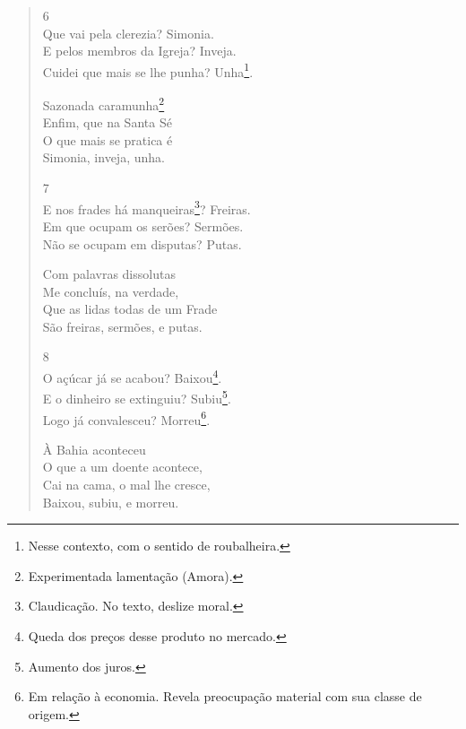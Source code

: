 \documentclass[12pt]{book}
\begin{document}
\begin{verse}
			6 \\
			Que vai pela clerezia? \dotfill Simonia. \\
			E pelos membros da Igreja? \dotfill Inveja. \\
			Cuidei que mais se lhe punha? \dotfill Unha\footnote{Nesse contexto, com o sentido de roubalheira.}.
			
			\hspace{5em} Sazonada caramunha\footnote{Experimentada lamentação (Amora).} \\
			\hspace{5em} Enfim, que na Santa Sé \\
			\hspace{5em} O que mais se pratica é \\
			\hspace{5em} Simonia, inveja, unha.
			
			7 \\
			E nos frades há manqueiras\footnote{Claudicação. No texto, deslize moral.}? \dotfill Freiras. \\
			Em que ocupam os serões? \dotfill Sermões. \\
			Não se ocupam em disputas? \dotfill Putas.
			
			\hspace{5em} Com palavras dissolutas \\
			\hspace{5em} Me concluís, na verdade, \\
			\hspace{5em} Que as lidas todas de um Frade\\
			\hspace{5em} São freiras, sermões, e putas.
			
			8 \\
			O açúcar já se acabou? \dotfill Baixou\footnote{Queda dos preços desse produto no mercado.}. \\
			E o dinheiro se extinguiu? \dotfill Subiu\footnote{Aumento dos juros.}. \\
			Logo já convalesceu? \dotfill Morreu\footnote{Em relação à economia. Revela preocupação material com sua classe de origem.}.
			
			\hspace{5em} À Bahia aconteceu \\
			\hspace{5em} O que a um doente acontece, \\
			\hspace{5em} Cai na cama, o mal lhe cresce, \\
			\hspace{5em} Baixou, subiu, e morreu.
			

\end{verse}
\end{document}
